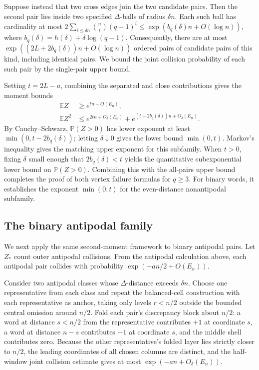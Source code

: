 Suppose instead that two cross edges join the two candidate pairs. Then the second pair lies inside two specified $\Delta$-balls of radius $\delta n$. Each such ball has cardinality at most $2\sum_{i\le\delta n}\binom ni(q-1)^i\le\exp(b_q(\delta)n+O(\log n))$, where $b_q(\delta)=h(\delta)+\delta\log(q-1)$. Consequently, there are at most $\exp((2L+2b_q(\delta))n+O(\log n))$ ordered pairs of candidate pairs of this kind, including identical pairs. We bound the joint collision probability of each such pair by the single-pair upper bound.

Setting $t=2L-a$, combining the separated and close contributions gives the moment bounds
\begin{align*}
 \mathbb EZ&\ge e^{tn-O(E_n)},\\
 \mathbb EZ^2&\le e^{2tn+O_\delta(E_n)}+e^{(t+2b_q(\delta))n+O_\delta(E_n)}.
\end{align*}
By Cauchy--Schwarz, $\mathbb P(Z>0)$ has lower exponent at least $\min(0,t-2b_q(\delta))$; letting $\delta\downarrow0$ gives the lower bound $\min(0,t)$. Markov's inequality gives the matching upper exponent for this subfamily. When $t>0$, fixing $\delta$ small enough that $2b_q(\delta)<t$ yields the quantitative subexponential lower bound on $\mathbb P(Z>0)$. Combining this with the all-pairs upper bound completes the proof of both vertex failure formulas for $q\ge3$. For binary words, it establishes the exponent $\min(0,t)$ for the even-distance nonantipodal subfamily.

\subsection{The binary antipodal family}
We next apply the same second-moment framework to binary antipodal pairs. Let $Z_*$ count outer antipodal collisions. From the antipodal calculation above, each antipodal pair collides with probability $\exp(-an/2+O(E_n))$.

Consider two antipodal classes whose $\Delta$-distance exceeds $\delta n$. Choose one representative from each class and repeat the balanced-cell construction with each representative as anchor, taking only levels $r<n/2$ outside the bounded central omission around $n/2$. Fold each pair's discrepancy block about $n/2$: a word at distance $s<n/2$ from the representative contributes $+1$ at coordinate $s$, a word at distance $n-s$ contributes $-1$ at coordinate $s$, and the middle shell contributes zero. Because the other representative's folded layer lies strictly closer to $n/2$, the leading coordinates of all chosen columns are distinct, and the half-window joint collision estimate gives at most $\exp(-an+O_\delta(E_n))$.

